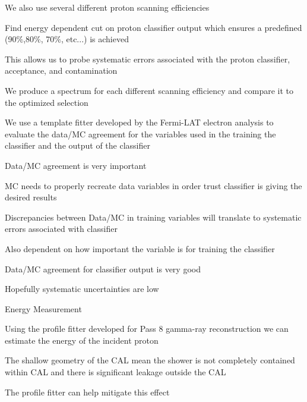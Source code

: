 \documentclass{article}
\begin{document}
\begin{myEnumerate}
\begin{myEnumerate}
\begin{myEnumerate}
					\item We also use several different proton scanning efficiencies
					\begin{myEnumerate}
						\item Find energy dependent cut on proton classifier output which ensures a predefined (90$\%$,80$\%$, 70$\%$, etc...) is achieved
						\item This allows us to probe systematic errors associated with the proton classifier, acceptance, and contamination
						\item We produce a spectrum for each different scanning efficiency and compare it to the optimized selection
					\end{myEnumerate}
					\item We use a template fitter developed by the Fermi-LAT electron analysis to evaluate the data/MC agreement for the variables used in the training the classifier and the output of the classifier
					\begin{myEnumerate}
						\item Data/MC agreement is very important
						\item MC needs to properly recreate data variables in order trust classifier is giving the desired results
						\item Discrepancies between Data/MC in training variables will translate to systematic errors associated with classifier
						\item Also dependent on how important the variable is for training the classifier
						\item Data/MC agreement for classifier output is very good
						\item Hopefully systematic uncertainties are low
					\end{myEnumerate}
				\end{myEnumerate}
			\end{myEnumerate}
		\item Energy Measurement
			\begin{myEnumerate}
				\item Using the profile fitter developed for Pass 8 gamma-ray reconstruction we can estimate the energy of the incident proton
				\begin{myEnumerate}
					\item The shallow geometry of the CAL mean the shower is not completely contained within CAL and there is significant leakage outside the CAL
					\item The profile fitter can help mitigate this effect 

\end{myEnumerate}
\end{myEnumerate}
\end{myEnumerate}
\end{document}
